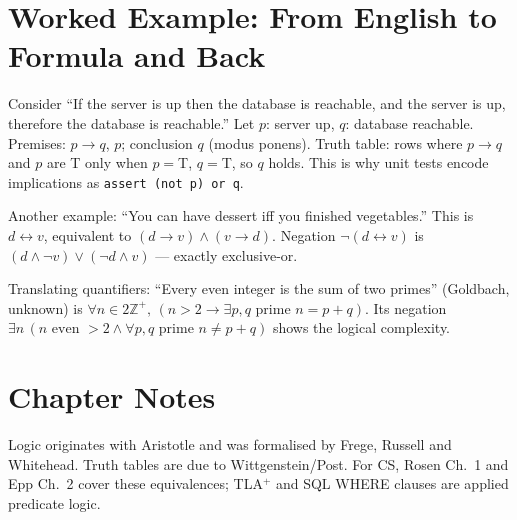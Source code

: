 \section{Worked Example: From English to Formula and Back}
Consider ``If the server is up then the database is reachable, and the server is up, therefore the database is reachable.'' Let $p$: server up, $q$: database reachable. Premises: $p\to q$, $p$; conclusion $q$ (modus ponens). Truth table: rows where $p\to q$ and $p$ are T only when $p=$T, $q=$T, so $q$ holds. This is why unit tests encode implications as \texttt{assert (not p) or q}.

Another example: ``You can have dessert iff you finished vegetables.'' This is $d\leftrightarrow v$, equivalent to $(d\to v)\land(v\to d)$. Negation $\neg(d\leftrightarrow v)$ is $(d\land\neg v)\lor(\neg d\land v)$ --- exactly exclusive-or.

Translating quantifiers: ``Every even integer is the sum of two primes'' (Goldbach, unknown) is $\forall n\in2\mathbb{Z}^+,\,(n>2\to\exists p,q\text{ prime }n=p+q)$. Its negation $\exists n\,(n\text{ even }>2\land\forall p,q\text{ prime }n\neq p+q)$ shows the logical complexity.

\section{Chapter Notes}
Logic originates with Aristotle and was formalised by Frege, Russell and Whitehead. Truth tables are due to Wittgenstein/Post. For CS, Rosen Ch.~1 and Epp Ch.~2 cover these equivalences; TLA$^+$ and SQL WHERE clauses are applied predicate logic.

